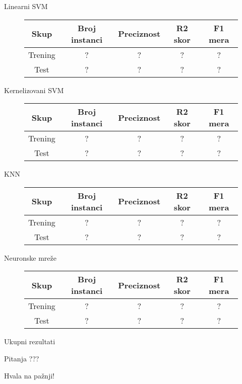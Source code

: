 \documentclass{beamer}
\begin{document}
\begin{frame}[fragile]{Linearni SVM}
    \begin{figure}[!h]
    \centering
    \begin{tabular}{ | c | c | c | c | c |}
        \hline
        Skup & Broj instanci & Preciznost & R2 skor & F1 mera \\
        \hline
        Trening & ? & ? & ? & ? \\
        Test & ? & ? & ? & ? \\
        \hline
    \end{tabular}
    \end{figure}
\end{frame}

\begin{frame}[fragile]{Kernelizovani SVM}
    \begin{figure}[!h]
    \centering
    \begin{tabular}{ | c | c | c | c | c |}
        \hline
        Skup & Broj instanci & Preciznost & R2 skor & F1 mera \\
        \hline
        Trening & ? & ? & ? & ? \\
        Test & ? & ? & ? & ? \\
        \hline
    \end{tabular}
    \end{figure}
\end{frame}

\begin{frame}[fragile]{KNN}
    \begin{figure}[!h]
    \centering
    \begin{tabular}{ | c | c | c | c | c |}
        \hline
        Skup & Broj instanci & Preciznost & R2 skor & F1 mera \\
        \hline
        Trening & ? & ? & ? & ? \\
        Test & ? & ? & ? & ? \\
        \hline
    \end{tabular}
    \end{figure}
\end{frame}

\begin{frame}[fragile]{Neuronske mre\v{z}e}
    \begin{figure}[!h]
    \centering
    \begin{tabular}{ | c | c | c | c | c|}
        \hline
        Skup & Broj instanci & Preciznost & R2 skor & F1 mera \\
        \hline
        Trening & ? & ? & ? & ? \\
        Test & ? & ? & ? & ? \\
        \hline
    \end{tabular}
    \end{figure}
\end{frame}

\begin{frame}[fragile]{Ukupni rezultati}
\end{frame}

\begin{frame}{Pitanja}
    \centering
    ???
\end{frame}

\begin{frame}{}
    \centering
    Hvala na pa\v{z}nji!
\end{frame}
\end{document}
